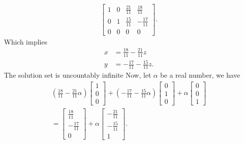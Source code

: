 \documentclass{report}
\begin{document}
\begin{itemize}
\begin{align*}
                \left[
                    \begin{array}{ccc|c}
                        1 & 0 & \frac{21}{11} & \frac{18}{11} \\
                        0 & 1 & \frac{15}{11} & -\frac{17}{11} \\
                        0 & 0 & 0 & 0 
                    \end{array}
                \right]
            .\end{align*}
            Which implies 
            \begin{align*}
                x &= \frac{18}{11} - \frac{21}{11}z \\
                y &= -\frac{17}{11}-\frac{15}{11}z
            .\end{align*}
            The solution set is uncountably infinite
            \bigbreak \noindent 
            Now, let $\alpha$ be a real number, we have
            \begin{align*}
                \left(\frac{18}{11} - \frac{21}{11}\alpha\right)
                \begin{bmatrix}
                    1 \\ 0 \\ 0 
                \end{bmatrix}
                + \left(-\frac{17}{11}-\frac{15}{11}\alpha\right)
                \begin{bmatrix}
                    0 \\ 1 \\ 0 
                \end{bmatrix}
               + \alpha
               \begin{bmatrix}
                   0 \\ 0 \\ 1
               \end{bmatrix} \\
               =
               \begin{bmatrix}
                   \frac{18}{11} \\ -\frac{17}{11} \\ 0
               \end{bmatrix}
               + \alpha
               \begin{bmatrix}
                   -\frac{21}{11} \\ -\frac{15}{11} \\ 1
               \end{bmatrix}
            .\end{align*}

\end{itemize}
\end{document}
